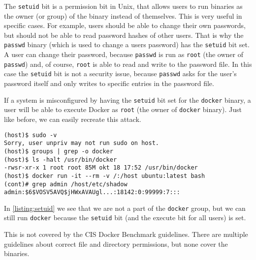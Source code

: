 \medskip

The \lstinline{setuid} bit is a permission bit in Unix, that allows users to run binaries as the owner (or group) of the binary instead of themselves.
This is very useful in specific cases. For example, users should be able to change their own passwords, but should not be able to read password hashes of other users. That is why the \lstinline{passwd} binary (which is used to change a users password) has the \lstinline{setuid} bit set. A user can change their password, because \lstinline{passwd} is run as \lstinline{root} (the owner of \lstinline{passwd}) and, of course, \lstinline{root} is able to read and write to the password file. In this case the \lstinline{setuid} bit is not a security issue, because \lstinline{passwd} asks for the user's password itself and only writes to specific entries in the password file.

\medskip

If a system is misconfigured by having the \lstinline{setuid} bit set for the \lstinline{docker} binary, a user will be able to execute Docker as \lstinline{root} (the owner of \lstinline{docker} binary). Just like before, we can easily recreate this attack.

\begin{lstlisting}[caption={Docker \lstinline{setuid} exploit example.},captionpos=b, label={listing:setuid}]
(host)$ sudo -v
Sorry, user unpriv may not run sudo on host.
(host)$ groups | grep -o docker
(host)$ ls -halt /usr/bin/docker
-rwsr-xr-x 1 root root 85M okt 18 17:52 /usr/bin/docker
(host)$ docker run -it --rm -v /:/host ubuntu:latest bash
(cont)# grep admin /host/etc/shadow
admin:$6$VOSV5AVQ$jHWxAVAUgl...:18142:0:99999:7:::
\end{lstlisting}

In \autoref{listing:setuid} we see that we are not a part of the \lstinline{docker} group, but we can still run \lstinline{docker} because the \lstinline{setuid} bit (and the execute bit for all users) is set.

\medskip

This is not covered by the CIS Docker Benchmark guidelines. There are multiple guidelines about correct file and directory permissions, but none cover the binaries.
